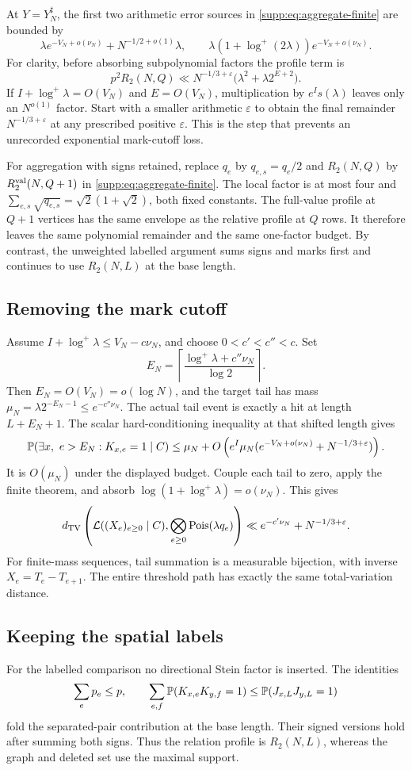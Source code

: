 At $Y=Y_N^\sharp$, the first two arithmetic error sources in
\eqref{supp:eq:aggregate-finite} are bounded by
\[
 \lambda e^{-V_N+o(\nu_N)}+N^{-1/2+o(1)}\lambda,
 \qquad
 \lambda(1+\log^+(2\lambda))e^{-V_N+o(\nu_N)}.
\]
For clarity, before absorbing subpolynomial factors the profile term is
\[
 p^2R_2(N,Q)
 \ll N^{-1/3+\varepsilon}
              \bigl(\lambda^2+\lambda 2^{E+2}\bigr).
\]
If $I+\log^+\lambda=O(V_N)$ and $E=O(V_N)$, multiplication by
$e^Is(\lambda)$ leaves only an $N^{o(1)}$ factor. Start with a smaller
arithmetic $\varepsilon$ to obtain the final remainder
$N^{-1/3+\varepsilon}$ at any prescribed positive $\varepsilon$.
This is the step that prevents an unrecorded exponential mark-cutoff loss.


For aggregation with signs retained, replace $q_e$ by
$q_{e,s}=q_e/2$ and $R_2(N,Q)$ by $R^{\rm val}_2(N,Q+1)$ in
\eqref{supp:eq:aggregate-finite}. The local factor is at most four and
$\sum_{e,s}\sqrt{q_{e,s}}=\sqrt2(1+\sqrt2)$, both fixed constants.
The full-value profile at $Q+1$ vertices has the same envelope as the
relative profile at $Q$ rows. It therefore leaves the same polynomial
remainder and the same one-factor budget. By contrast, the unweighted
labelled argument sums signs and marks first and continues to use
$R_2(N,L)$ at the base length.

\subsection{Removing the mark cutoff}
Assume $I+\log^+\lambda\le V_N-c\nu_N$, and choose
$0<c'<c''<c$. Set
\[
 E_N=\left\lceil
        \frac{\log^+\lambda+c''\nu_N}{\log2}\right\rceil .
\]
Then $E_N=O(V_N)=o(\log N)$, and the target tail has mass
$\mu_N=\lambda2^{-E_N-1}\le e^{-c''\nu_N}$.
The actual tail event is exactly a hit at length $L+E_N+1$.
The scalar hard-conditioning inequality at that shifted length gives
\[
 \mathbb P(\exists x,\ e>E_N:K_{x,e}=1\mid C)
 \le \mu_N+
 O\left(e^I\mu_N
      (e^{-V_N+o(\nu_N)}+N^{-1/3+\varepsilon})\right).
\]
It is $O(\mu_N)$ under the displayed budget. Couple each tail to zero,
apply the finite theorem, and absorb
$\log(1+\log^+\lambda)=o(\nu_N)$. This gives
\[
 d_{\mathrm{TV}}\left(\mathcal L((X_e)_{e\ge0}\mid C),
                  \bigotimes_{e\ge0}\operatorname{Pois}(\lambda q_e)\right)
 \ll e^{-c'\nu_N}+N^{-1/3+\varepsilon}.
\]
For finite-mass sequences, tail summation is a measurable bijection,
with inverse $X_e=T_e-T_{e+1}$. The entire threshold path has exactly the
same total-variation distance.

\subsection{Keeping the spatial labels}
\label{supp:sec:information-cutoff}
For the labelled comparison no directional Stein factor is inserted.
The identities
\[
 \sum_e p_e\le p,\qquad
 \sum_{e,f}\mathbb P(K_{x,e}K_{y,f}=1)\le\mathbb P(J_{x,L}J_{y,L}=1)
\]
fold the separated-pair contribution at the base length. Their signed
versions hold after summing both signs. Thus the relation profile is
$R_2(N,L)$, whereas the graph and deleted set use the maximal support.

